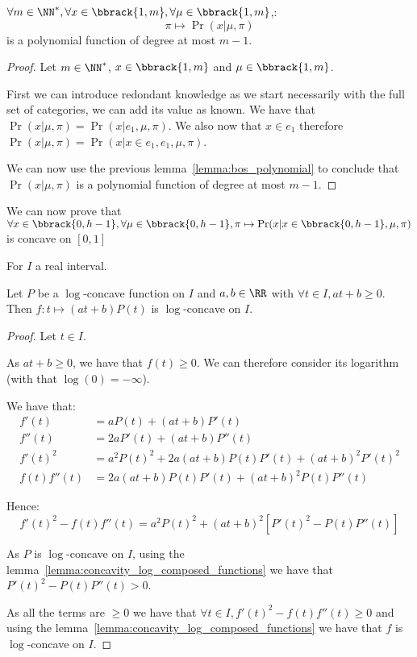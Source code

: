 \begin{thm}
    \label{thm:likelihood_bos_is_polynomial}
    $\forall m \in \NN^*, \forall x \in \bbrack{1, m}, \forall \mu \in \bbrack{1, m}$,:
    \[ \pi \mapsto \Pr(x | \mu, \pi) \]
    is a polynomial function of degree at most $m - 1$.  
\end{thm}
\begin{proof}
    Let $m \in \NN^*$, $x \in \bbrack{1, m}$ and $\mu \in \bbrack{1, m}$. 

    First we can introduce redondant knowledge as we start necessarily with the full set of categories, we can add its value as known. We have that $\Pr(x | \mu, \pi) = \Pr(x | e_1, \mu, \pi)$. We also now that $x \in e_1$ therefore $\Pr(x | \mu, \pi) = \Pr(x | x \in e_1, e_1, \mu, \pi)$.

    We can now use the previous lemma~\ref{lemma:bos_polynomial} to conclude that $\Pr(x | \mu, \pi)$ is a polynomial function of degree at most $m - 1$.
\end{proof}


We can now prove that $\forall x \in \bbrack{0, h - 1}, \forall \mu \in \bbrack{0, h - 1}, \pi \mapsto \Pr(x | x \in \bbrack{0, h - 1}, \mu, \pi)$ is concave on $[0, 1]$


\begin{lemma}
    \label{lemma:concavity_log_polynomial_times_affine}
    For $I$ a real interval.

    Let $P$ be a $\log$-concave function on $I$ and $a, b \in \RR$ with $\forall t  \in I, at + b \geq 0$. Then $f: t \mapsto (at + b)P(t)$ is $\log$-concave on $I$.
\end{lemma}
\begin{proof}
    Let $t \in I$.

    As $at + b \geq 0$, we have that $f(t) \geq 0$. We can therefore consider its logarithm (with that $\log(0) = -\infty$).

    We have that:
    \begin{align}
        f'(t) &= aP(t) + (at + b)P'(t) \\
        f''(t) &= 2 aP'(t) + (at + b)P''(t) \\
        f'(t)^2 &= a^2P(t)^2 + 2a(at + b)P(t)P'(t) + (at + b)^2P'(t)^2 \\
        f(t)f''(t) &= 2a(at + b) P(t)P'(t) + (at + b)^2P(t)P''(t)
    \end{align}

    Hence:
    \[f'(t)^2 - f(t) f''(t) = a^2 P(t)^2 + (at + b)^2 \left[ P'(t)^2 - P(t)P''(t) \right] \]

    As $P$ is $\log$-concave on $I$, using the lemma~\ref{lemma:concavity_log_composed_functions} we have that $P'(t)^2 - P(t)P''(t) > 0$.
    
    As all the terms are $\geq 0$ we have that $\forall t \in I, f'(t)^2 - f(t) f''(t) \geq 0$ and using the lemma~\ref{lemma:concavity_log_composed_functions} we have that $f$ is $\log$-concave on $I$.
\end{proof}

